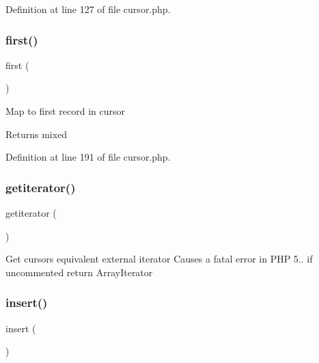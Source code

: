 Definition at line 127 of file cursor.\+php.

\hypertarget{class_d_b_1_1_cursor_ac73eef9ff76ea330c0dab36ca448b90d}{}\label{class_d_b_1_1_cursor_ac73eef9ff76ea330c0dab36ca448b90d} 
\subsubsection{\texorpdfstring{first()}{first()}}
{\footnotesize\ttfamily first (\begin{DoxyParamCaption}{ }\end{DoxyParamCaption})}

Map to first record in cursor \begin{DoxyReturn}{Returns}
mixed 
\end{DoxyReturn}


Definition at line 191 of file cursor.\+php.

\hypertarget{class_d_b_1_1_cursor_a7f835c25df4cb49d02328644722656da}{}\label{class_d_b_1_1_cursor_a7f835c25df4cb49d02328644722656da} 
\subsubsection{\texorpdfstring{getiterator()}{getiterator()}}
{\footnotesize\ttfamily getiterator (\begin{DoxyParamCaption}{ }\end{DoxyParamCaption})\hspace{0.3cm}{\ttfamily [abstract]}}

Get cursor\textquotesingle{}s equivalent external iterator Causes a fatal error in P\+HP 5.. if uncommented return Array\+Iterator \hypertarget{class_d_b_1_1_cursor_a473241246338cfccc4709ba896749019}{}\label{class_d_b_1_1_cursor_a473241246338cfccc4709ba896749019} 
\subsubsection{\texorpdfstring{insert()}{insert()}}
{\footnotesize\ttfamily insert (\begin{DoxyParamCaption}{ }\end{DoxyParamCaption})\hspace{0.3cm}{\ttfamily [abstract]}}

